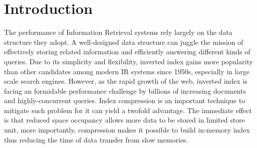 \documentclass[runningheads,a4paper]{llncs}
\begin{document}
\section{Introduction}
The performance of Information Retrieval systems rely largely on the data structure they adopt.
A well-designed data structure can juggle the mission of effectively storing related information and efficiently answering different kinds of queries.
Due to its simplicity and flexibility, inverted index gains more popularity than other candidates among modern IR systems since 1950s\cite{buttcher2010information,witten1999managing}, especially in large scale search engines.
However, as the rapid growth of the web, inverted index is facing an formidable performance challenge by billions of increasing documents and highly-concurrent queries.
Index compression is an important technique to mitigate such problem for it can yield a twofold advantage.
The immediate effect is that reduced space occupancy allows more data to be stored in limited store unit, more importantly, compression makes it possible to build in-memory index thus reducing the time of data transfer from slow memories\cite{manning2008introduction,zobel2006inverted}.

\end{document}
